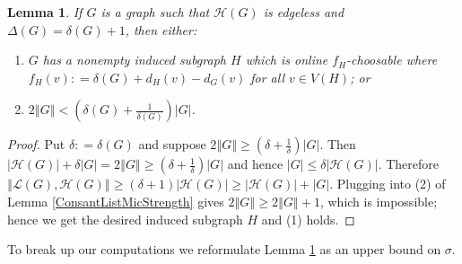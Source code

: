 \documentclass[12pt]{article}
\theoremstyle{plain}
\newtheorem{lem}[thm]{Lemma}
\theoremstyle{definition}
\theoremstyle{remark}
\newcommand{\fancy}[1]{\mathcal{#1}}
\renewcommand{\L}{\fancy{L}}
\newcommand{\HH}{\fancy{H}}
\newcommand{\card}[1]{\left|#1\right|}
\newcommand{\size}[1]{\left\Vert#1\right\Vert}
\newcommand{\parens}[1]{\left( #1 \right)}
\newcommand{\DefinedAs}{\mathrel{\mathop:}=}
\begin{document}
\begin{lem}\label{OrePrecursor1}
If $G$ is a graph such that $\HH(G)$ is edgeless and $\Delta(G) = \delta(G) + 1$, then either:
\begin{enumerate}
\item $G$ has a nonempty induced subgraph $H$ which is online $f_H$-choosable where $f_H(v) \DefinedAs \delta(G) + d_H(v) - d_G(v)$ for all $v \in V(H)$; or
\item $2\size{G} < \parens{\delta(G) + \frac{1}{\delta(G)}}\card{G}$.
\end{enumerate}
\end{lem}
\begin{proof}
Put $\delta \DefinedAs \delta(G)$ and suppose $2\size{G} \geq \parens{\delta + \frac{1}{\delta}}\card{G}$.  Then $\card{\HH(G)} + \delta\card{G} = 2\size{G} \geq \parens{\delta + \frac{1}{\delta}}\card{G}$ and hence $\card{G} \leq \delta\card{\HH(G)}$.  Therefore $\size{\L(G), \HH(G)} \geq (\delta + 1)\card{\HH(G)} \geq \card{\HH(G)} + \card{G}$.  Plugging into (2) of Lemma \ref{ConsantListMicStrength} gives $2\size{G} \geq 2\size{G} + 1$, which is impossible; hence we get the desired induced subgraph $H$ and (1) holds.
\end{proof}

To break up our computations we reformulate Lemma \ref{OrePrecursor1} as an upper bound on $\sigma$.
\end{document}
